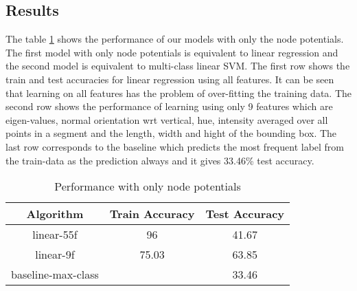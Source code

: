 \documentclass[11pt]{article} %
\begin{document}
   \subsection{Results}
   The table \ref{tab:result_set1} shows the performance of our models with only the node potentials. The first model with only node potentials is equivalent to linear regression and the second model is equivalent to multi-class linear SVM. The first row shows the train and test accuracies for linear regression using all features. It can be seen that learning on all features has the problem of over-fitting the training data. The second row shows the performance of learning using only 9 features which are eigen-values, normal orientation wrt vertical, hue, intensity averaged over all points in a segment and the length, width and hight of the bounding box. The last row corresponds to the baseline which predicts the most frequent label from the train-data as the prediction always and it gives 33.46\% test accuracy. 
   
      \begin{table}[!h]
        \label{tab:result_set1}
          \begin{center}
            \begin{tabular}{|c|c|c|} \hline
               Algorithm  & Train Accuracy & Test Accuracy \\ \hline
               linear-55f & 96 & 41.67\\  \hline
               linear-9f & 75.03 &  63.85\\ \hline
               baseline-max-class  &  & 33.46 \\ \hline
            \end{tabular}
         \caption{Performance with only node potentials }
        \end{center} 
      \end{table}
      
      \newpage
 
\end{document}

